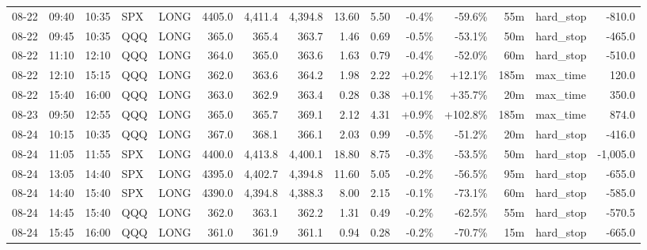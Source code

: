 \documentclass[11pt,a4paper,twoside]{article}
\begin{document}
\begin{landscape}
\begin{center}
\begin{longtable}{>{\color{txtmain}}l l l l l r r r r r r r r >{\color{txtmain}}l r}
08-22 & 09:40 & 10:35 & SPX & LONG & 4405.0 & 4,411.4 & 4,394.8 & 13.60 & 5.50 & \textcolor{lossred}{-0.4\%} & \textcolor{lossred}{-59.6\%} & 55m & hard\_stop & \textcolor{lossred}{-810.0} \\
08-22 & 09:45 & 10:35 & QQQ & LONG & 365.0 & 365.4 & 363.7 & 1.46 & 0.69 & \textcolor{lossred}{-0.5\%} & \textcolor{lossred}{-53.1\%} & 50m & hard\_stop & \textcolor{lossred}{-465.0} \\
08-22 & 11:10 & 12:10 & QQQ & LONG & 364.0 & 365.0 & 363.6 & 1.63 & 0.79 & \textcolor{lossred}{-0.4\%} & \textcolor{lossred}{-52.0\%} & 60m & hard\_stop & \textcolor{lossred}{-510.0} \\
08-22 & 12:10 & 15:15 & QQQ & LONG & 362.0 & 363.6 & 364.2 & 1.98 & 2.22 & \textcolor{wingreen}{+0.2\%} & \textcolor{wingreen}{+12.1\%} & 185m & max\_time & \textcolor{wingreen}{120.0} \\
08-22 & 15:40 & 16:00 & QQQ & LONG & 363.0 & 362.9 & 363.4 & 0.28 & 0.38 & \textcolor{wingreen}{+0.1\%} & \textcolor{wingreen}{+35.7\%} & 20m & max\_time & \textcolor{wingreen}{350.0} \\
08-23 & 09:50 & 12:55 & QQQ & LONG & 365.0 & 365.7 & 369.1 & 2.12 & 4.31 & \textcolor{wingreen}{+0.9\%} & \textcolor{wingreen}{+102.8\%} & 185m & max\_time & \textcolor{wingreen}{874.0} \\
08-24 & 10:15 & 10:35 & QQQ & LONG & 367.0 & 368.1 & 366.1 & 2.03 & 0.99 & \textcolor{lossred}{-0.5\%} & \textcolor{lossred}{-51.2\%} & 20m & hard\_stop & \textcolor{lossred}{-416.0} \\
08-24 & 11:05 & 11:55 & SPX & LONG & 4400.0 & 4,413.8 & 4,400.1 & 18.80 & 8.75 & \textcolor{lossred}{-0.3\%} & \textcolor{lossred}{-53.5\%} & 50m & hard\_stop & \textcolor{lossred}{-1,005.0} \\
08-24 & 13:05 & 14:40 & SPX & LONG & 4395.0 & 4,402.7 & 4,394.8 & 11.60 & 5.05 & \textcolor{lossred}{-0.2\%} & \textcolor{lossred}{-56.5\%} & 95m & hard\_stop & \textcolor{lossred}{-655.0} \\
08-24 & 14:40 & 15:40 & SPX & LONG & 4390.0 & 4,394.8 & 4,388.3 & 8.00 & 2.15 & \textcolor{lossred}{-0.1\%} & \textcolor{lossred}{-73.1\%} & 60m & hard\_stop & \textcolor{lossred}{-585.0} \\
08-24 & 14:45 & 15:40 & QQQ & LONG & 362.0 & 363.1 & 362.2 & 1.31 & 0.49 & \textcolor{lossred}{-0.2\%} & \textcolor{lossred}{-62.5\%} & 55m & hard\_stop & \textcolor{lossred}{-570.5} \\
08-24 & 15:45 & 16:00 & QQQ & LONG & 361.0 & 361.9 & 361.1 & 0.94 & 0.28 & \textcolor{lossred}{-0.2\%} & \textcolor{lossred}{-70.7\%} & 15m & hard\_stop & \textcolor{lossred}{-665.0} \\

\end{longtable}
\end{center}
\end{landscape}
\end{document}

